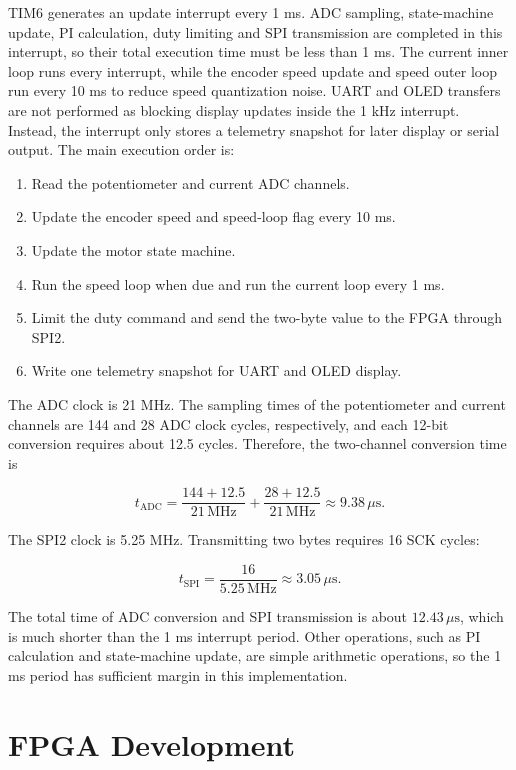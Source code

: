 \documentclass[12pt, a4paper]{report}
\begin{document}
TIM6 generates an update interrupt every 1 ms. ADC sampling, state-machine update, PI calculation, duty limiting and SPI transmission are completed in this interrupt, so their total execution time must be less than 1 ms. The current inner loop runs every interrupt, while the encoder speed update and speed outer loop run every 10 ms to reduce speed quantization noise. UART and OLED transfers are not performed as blocking display updates inside the 1 kHz interrupt. Instead, the interrupt only stores a telemetry snapshot for later display or serial output. The main execution order is:
\begin{enumerate}
    \item Read the potentiometer and current ADC channels.
    \item Update the encoder speed and speed-loop flag every 10 ms.
    \item Update the motor state machine.
    \item Run the speed loop when due and run the current loop every 1 ms.
    \item Limit the duty command and send the two-byte value to the FPGA through SPI2.
    \item Write one telemetry snapshot for UART and OLED display.
\end{enumerate}

The ADC clock is 21 MHz. The sampling times of the potentiometer and current channels are 144 and 28 ADC clock cycles, respectively, and each 12-bit conversion requires about 12.5 cycles. Therefore, the two-channel conversion time is

\[
t_{\mathrm{ADC}}
=\frac{144+12.5}{21\,\mathrm{MHz}}
+\frac{28+12.5}{21\,\mathrm{MHz}}
\approx 9.38\,\mu\mathrm{s}.
\]

The SPI2 clock is 5.25 MHz. Transmitting two bytes requires 16 SCK cycles:

\[
t_{\mathrm{SPI}}=\frac{16}{5.25\,\mathrm{MHz}}
\approx 3.05\,\mu\mathrm{s}.
\]

The total time of ADC conversion and SPI transmission is about \(12.43\,\mu\text{s}\), which is much shorter than the 1 ms interrupt period. Other operations, such as PI calculation and state-machine update, are simple arithmetic operations, so the 1 ms period has sufficient margin in this implementation.


\chapter{FPGA Development}
\end{document}
